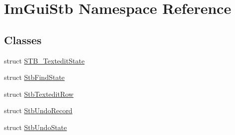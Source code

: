 \hypertarget{namespace_im_gui_stb}{}\section{Im\+Gui\+Stb Namespace Reference}
\label{namespace_im_gui_stb}
\subsection*{Classes}
\begin{DoxyCompactItemize}
\item 
struct \mbox{\hyperlink{struct_im_gui_stb_1_1_s_t_b___textedit_state}{S\+T\+B\+\_\+\+Textedit\+State}}
\item 
struct \mbox{\hyperlink{struct_im_gui_stb_1_1_stb_find_state}{Stb\+Find\+State}}
\item 
struct \mbox{\hyperlink{struct_im_gui_stb_1_1_stb_textedit_row}{Stb\+Textedit\+Row}}
\item 
struct \mbox{\hyperlink{struct_im_gui_stb_1_1_stb_undo_record}{Stb\+Undo\+Record}}
\item 
struct \mbox{\hyperlink{struct_im_gui_stb_1_1_stb_undo_state}{Stb\+Undo\+State}}
\end{DoxyCompactItemize}
